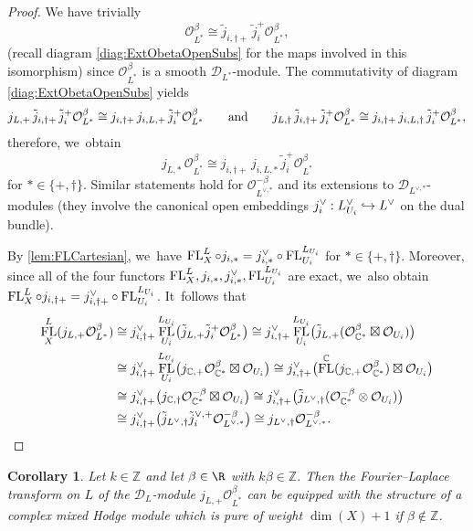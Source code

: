 \documentclass[JEP,XML,SOM,Unicode,published]{cedram}
\let\mathds\mathbb
\newcommand\hto{\mathrel{\lhook\joinrel\to}}
\newtheorem{cor}[thm]{Corollary}
\newcommand{\dC}{{\mathds C}}\let\C\dC
\newcommand{\dZ}{{\mathds Z}}\let\mbz\dZ\let\Z\dZ
\newcommand{\cD}{\mathscr{D}}
\newcommand{\cO}{\mathcal{O}}\let\O\cO
\DeclareMathOperator{\FL}{\textup{FL}}
\begin{document}
\begin{proof}
We have trivially
\[
\cO^\beta_{L^{*}} \cong \tilde{j}_{i,\dag+}\, \tilde{j}_i^+ \cO^\beta_{L^{*}},
\]
(recall diagram \eqref{diag:ExtObetaOpenSubs} for the maps involved in this isomorphism) since $\cO_{L^*}^\beta$ is a smooth $\cD_{L^*}$\nobreakdash-mod\-ule. The commutativity of
diagram \eqref{diag:ExtObetaOpenSubs} yields
\[
j_{L,+}\,\tilde{j}_{i,\dag+}\, \tilde{j}_i^+\cO_{L^*}^\beta \cong j_{i,\dag+}\, j_{i,L,+}\, \tilde{j}_i^+\cO_{L^*}^\beta
\quad\quad
\textup{and}
\quad\quad
j_{L,\dag}\,\tilde{j}_{i,\dag+}\, \tilde{j}_i^+\cO_{L^*}^\beta \cong j_{i,\dag+}\, j_{i,L,\dag}\, \tilde{j}_i^+\cO_{L^*}^\beta,
\]
therefore, we~obtain
\[
j_{L,\ast}\, \cO_{L^*}^\beta \cong j_{i,\dag+}\, j_{i,L,\ast}\, \tilde{j}_i^+\cO_{L^*}^\beta
\]
for $\ast\in\{+,\dag\}$.
Similar statements hold for $\cO_{L^{\vee,*}}^{-\beta}$ and its extensions to $\cD_{L^{\vee,*}}$\nobreakdash-mod\-ules (they involve the canonical open embeddings $j_i^\vee:L^\vee_{U_i}\hto L^\vee$ on the dual bundle).

By \cref{lem:FLCartesian}, we~have $\FL^L_X \circ j_{i,\ast}=j^\vee_{i,\ast}\circ\FL^{L_{U_i}}_{U_i}$ for $\ast\in\{+,\dag\}$. Moreover, since
all of the four functors $\FL^L_X, j_{i,\ast}, j^\vee_{i,\ast}, \FL^{L_{U_i}}_{U_i}$
are exact, we~also obtain $\FL^L_X \circ j_{i,\dag+}=j^\vee_{i,\dag+}\circ\FL^{L_{U_i}}_{U_i}$. It~follows that
\begin{align*}
\FL^L_X(j_{L,+} \O_{L^{*}}^{\beta})
&\cong 
j^\vee_{i,\dag+} \FL^{L_{U_i}}_{U_i} \bigl(\tilde{j}_{L,+} \tilde{j}_{i}^+ \cO^\beta_{L^{*}} \bigr)
\cong 
j^\vee_{i,\dag+} \FL^{L_{U_i}}_{U_i} \bigl(\tilde{j}_{L,+}(\cO_{\dC^*}^\beta\boxtimes\cO_{U_i}) \bigr)
\\
&\cong j^\vee_{i,\dag+} \FL^{L_{U_i}}_{U_i} \bigl(j_{\dC,+}\cO_{\dC^*}^\beta\boxtimes\cO_{U_i}\bigr)
\cong j^\vee_{i,\dag+} \bigl(\FL^{\dC} (j_{\dC,+}\cO_{\dC^*}^\beta)\boxtimes\cO_{U_i}\bigr)
\\
&\cong j^\vee_{i,\dag+} \bigl(j_{\dC,\dag}\cO_{\dC^*}^{-\beta}\boxtimes\cO_{U_i}\bigr)
\cong j^\vee_{i,\dag+} \bigl(\tilde{j}_{L^\vee,\dag}(\cO_{\dC^*}^{-\beta}\otimes \cO_{U_i})\bigr)
\\
&\cong j^\vee_{i,\dag+} \bigl(\tilde{j}_{L^\vee,\dag} \tilde{j}_i^{\vee,+}\cO^{-\beta}_{L^{\vee,*}}\bigr)
\cong j_{L^\vee,\dag}\cO^{-\beta}_{L^{\vee,*}}.\qedhere
\end{align*}
\end{proof}

\begin{cor} \label{cor:FLofOBetaIsMHM}
Let $k \in \Z$ and let $\beta \in \R$ with $k\beta \in \Z$. Then the Fourier--Laplace transform on $L$ of the $\mathscr{D}_{L}$\nobreakdash-mod\-ule $j_{L,+}\O_{L^*}^\beta$ can be equipped with the structure of a complex mixed Hodge module which is pure of weight $\dim(X)+1$ if $\beta\notin \dZ$.
\end{cor}
\end{document}
